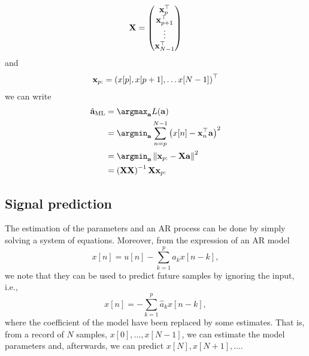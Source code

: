 \begin{align}
{\bf X} = 
\begin{pmatrix}
{\bf x}_p^\top \\
{\bf x}_{p+1}^\top \\
\vdots  \\
{\bf x}_{N-1}^\top
\end{pmatrix}
\end{align}
and
\begin{align*}
{\bf x}_{p:} = \left(x[p], x[p+1],\ldots x[N-1]\right)^\top
\end{align*}
we can write
\begin{align}
\hat{\bf a}_\text{ML}
	&= \argmax_{\bf a} L({\bf a})     \nonumber\\ 
	&= \argmin_{\bf a} \sum_{n=p}^{N-1} \left(x[n] - {\bf x}_n^\top{\bf a}\right)^2 
                                      \nonumber\\
	&= \argmin_{\bf a} \left\|{\bf x}_{p:} - {\bf X}{\bf a}\right\|^2 
              \nonumber\\
	&= \left({\bf X}{\bf X}\right)^{-1}{\bf X}{\bf x}_{p:} 
              \nonumber\\
\end{align}


\subsection{Signal prediction}

The estimation of the parameters and an AR process can be done by simply solving a system of equations. Moreover, from the expression of an AR model
\begin{equation*}
x[n]  = u[n] - \sum_{k = 1}^{p} a_k x[n -k],
\end{equation*}
we note that they can be used to predict future samples by ignoring the input, i.e.,
\begin{equation*}
x[n]  =  - \sum_{k = 1}^{p} \hat{a}_k x[n -k],
\end{equation*}
where the coefficient of the model have been replaced by some estimates. That is, from a record of $N$ samples, $x[0], \ldots, x[N-1]$, we can estimate the model parameters and, afterwards, we can predict $x[N], x[N+1], \ldots$.
